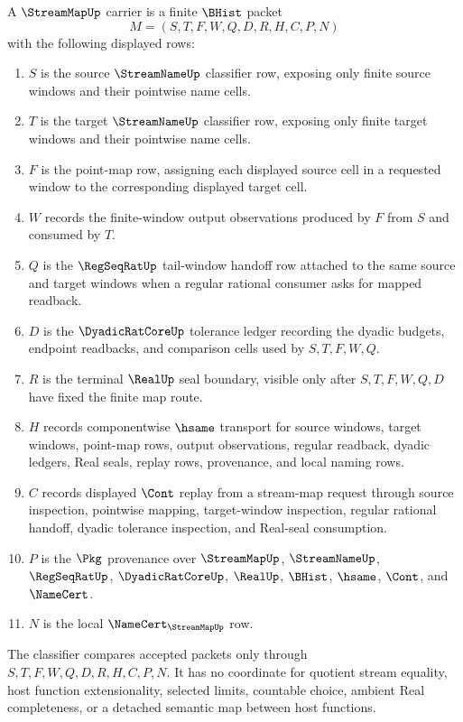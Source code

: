 \begin{definition}
\label{def:stream-map-carrier}
A $\StreamMapUp$ carrier is a finite $\BHist$ packet
$$
M=(S,T,F,W,Q,D,R,H,C,P,N)
$$
with the following displayed rows:
\begin{enumerate}
\item $S$ is the source $\StreamNameUp$ classifier row, exposing only finite source windows and their pointwise name cells.
\item $T$ is the target $\StreamNameUp$ classifier row, exposing only finite target windows and their pointwise name cells.
\item $F$ is the point-map row, assigning each displayed source cell in a requested window to the corresponding displayed target cell.
\item $W$ records the finite-window output observations produced by $F$ from $S$ and consumed by $T$.
\item $Q$ is the $\RegSeqRatUp$ tail-window handoff row attached to the same source and target windows when a regular rational consumer asks for mapped readback.
\item $D$ is the $\DyadicRatCoreUp$ tolerance ledger recording the dyadic budgets, endpoint readbacks, and comparison cells used by $S,T,F,W,Q$.
\item $R$ is the terminal $\RealUp$ seal boundary, visible only after $S,T,F,W,Q,D$ have fixed the finite map route.
\item $H$ records componentwise $\hsame$ transport for source windows, target windows, point-map rows, output observations, regular readback, dyadic ledgers, Real seals, replay rows, provenance, and local naming rows.
\item $C$ records displayed $\Cont$ replay from a stream-map request through source inspection, pointwise mapping, target-window inspection, regular rational handoff, dyadic tolerance inspection, and Real-seal consumption.
\item $P$ is the $\Pkg$ provenance over $\StreamMapUp$, $\StreamNameUp$, $\RegSeqRatUp$, $\DyadicRatCoreUp$, $\RealUp$, $\BHist$, $\hsame$, $\Cont$, and $\NameCert$.
\item $N$ is the local $\NameCert_{\StreamMapUp}$ row.
\end{enumerate}
The classifier compares accepted packets only through $S,T,F,W,Q,D,R,H,C,P,N$. It has no coordinate for quotient stream equality, host function extensionality, selected limits, countable choice, ambient Real completeness, or a detached semantic map between host functions.
\end{definition}

